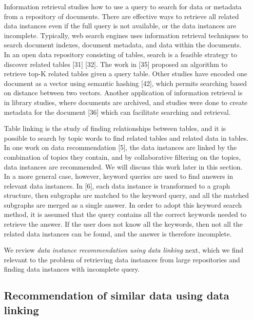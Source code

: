 Information retrieval studies how to use a query to search for data or metadata from a repository of documents. There are effective ways to retrieve all related data instances even if the full query is not available, or the data instances are incomplete. Typically, web search engines uses information retrieval techniques to search document indexes, document metadata, and data within the documents. In an open data repository consisting of tables, search is a feasible strategy to discover related tables \cite{Miller2018MakingOD}[31] \cite{10.14778/3229863.3240491}[32]. The work in \cite{Nargesian2018Table}[35] proposed an algorithm to retrieve top-K related tables given a query table. Other studies have encoded one document as a vector using semantic hashing \cite{Salakhutdinov2009Semantic}[42], which permits searching based on distance between two vectors. Another application of information retrieval is in library studies, where documents are archived, and studies were done to create metadata for the document \cite{Park2015Evaluation}[36] which can facilitate searching and retrieval.

Table linking is the study of finding relationships between tables, and it is possible to search by topic words to find related tables and related data in tables. In one work on data recommendation \cite{conf/esws/EllefiBDT16}[5], the data instances are linked by the combination of topics they contain, and by collaborative filtering on the topics, data instances are recommended. We will discuss this work later in this section. In a more general case, however, keyword queries are used to find answers in relevant data instances. In \cite{DBLP:journals/pvldb/ChanialDGLNM18}[6], each data instance is transformed to a graph structure, then subgraphs are matched to the keyword query, and all the matched subgraphs are merged as a single answer. In order to adopt this keyword search method, it is assumed that the query contains all the correct keywords needed to retrieve the answer. If the user does not know all the keywords, then not all the related data instances can be found, and the answer is therefore incomplete.

We review \textit{data instance recommendation using data linking} next, which we find relevant to the problem of retrieving data instances from large repositories and finding data instances with incomplete query.

\subsection{Recommendation of similar data using data linking}

